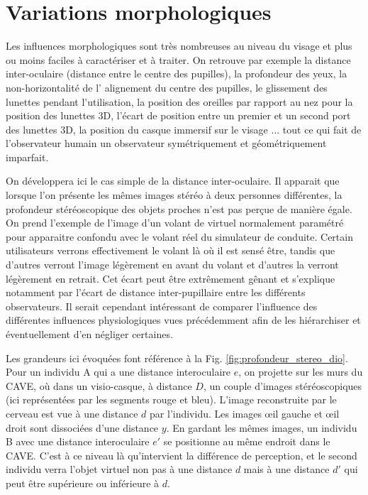 	\section{Variations morphologiques}
	\par Les influences morphologiques sont très nombreuses au niveau du visage et plus ou moins faciles à caractériser et à traiter. On retrouve par exemple la distance inter-oculaire (distance entre le centre des pupilles), la profondeur des yeux, la non-horizontalité de l' alignement du centre des pupilles, le glissement des lunettes pendant l'utilisation, la position des oreilles par rapport au nez pour la position des lunettes 3D, l'écart de position entre un premier et un second port des lunettes 3D, la position du casque immersif sur le visage ... tout ce qui fait de l'observateur humain un observateur symétriquement et géométriquement imparfait.
	
	\par On développera ici le cas simple de la distance inter-oculaire. Il apparait que lorsque l'on présente les mêmes images stéréo à deux personnes différentes, la profondeur stéréoscopique des objets proches n'est pas perçue de manière égale. On prend l'exemple de l'image d'un volant de virtuel normalement paramétré pour apparaitre confondu avec le volant réel du simulateur de conduite. Certain utilisateurs verrons effectivement le volant là où il est sensé être, tandis que d'autres verront l'image légèrement en avant du volant et d'autres la verront légèrement en retrait. Cet écart peut être extrêmement gênant et s'explique notamment par l'écart de distance inter-pupillaire entre les différents observateurs. Il serait cependant intéressant de comparer l'influence des différentes influences physiologiques vues précédemment afin de les hiérarchiser et éventuellement d'en négliger certaines.
	
	\par Les grandeurs ici évoquées font référence à la Fig. \ref{fig:profondeur_stereo_dio}. Pour un individu A qui a une distance interoculaire $e$, on projette sur les murs du CAVE, où dans un visio-casque, à distance $D$, un couple d'images stéréoscopiques (ici représentées par les segments rouge et bleu). L'image reconstruite par le cerveau est vue à une distance $d$ par l'individu. Les images œil gauche et œil droit sont dissociées d'une distance $y$. En gardant les mêmes images, un individu B avec une distance interoculaire $e\prime$ se positionne au même endroit dans le CAVE. C'est à ce niveau là qu'intervient la différence de perception, et le second individu verra l'objet virtuel non pas à une distance $d$ mais à une distance $d\prime$ qui peut être supérieure ou inférieure à $d$.


